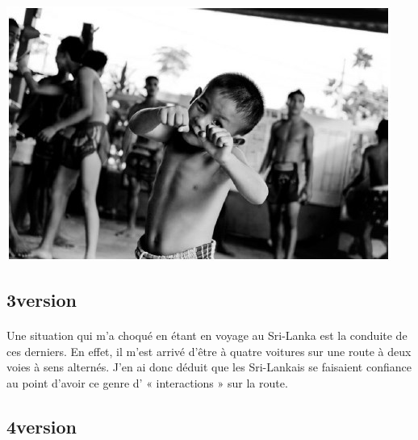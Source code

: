 \begin{center}
\includegraphics[scale=0.7]{Thai3.jpg}
\end{center}


\subsection{3\ieme version}
\paragraph{}
Une situation qui m'a choqué en étant en voyage au Sri-Lanka est la conduite de
ces derniers. En effet, il m'est arrivé d'être à quatre voitures sur une route
à deux voies à sens alternés. J'en ai donc déduit que les Sri-Lankais se
faisaient confiance au point d'avoir ce genre d' « interactions » sur la route.

\subsection{4\ieme version}
